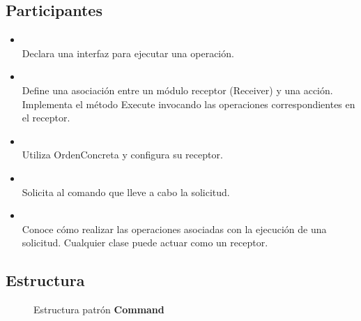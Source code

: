 \subsection*{Participantes}


\begin{itemize}
\item \Orden\\
Declara una interfaz para ejecutar una operación.

\item \OrdenConcreta\\
Define una asociación entre un módulo receptor (Receiver) y una acción.
Implementa el método Execute invocando las operaciones correspondientes en el receptor.

\item \Cliente\\
Utiliza OrdenConcreta y configura su receptor.

\item \Invocador\\
Solicita al comando que lleve a cabo la solicitud.

\item \Receptor\\
Conoce cómo realizar las operaciones asociadas con la ejecución de una solicitud. Cualquier clase puede actuar como un receptor.
\end{itemize}


\subsection*{Estructura}

\begin{figure}[h]
\caption{Estructura patrón \textbf{Command}}
\begin{center}
\end{center}
\end{figure}


